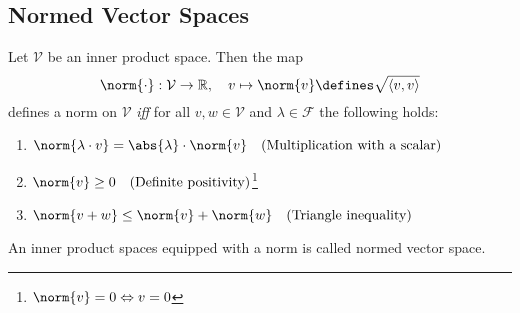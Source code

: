 \subsection{Normed Vector Spaces}\label{subsec-normed-vector-spaces}

\begin{definition}\label{def-norm}
	Let $\mathcal{V}$ be an inner product space. Then the map
	\begin{equation}
		\norm{\cdot}:\mathcal{V}\to\mathbb{R},
		\quad v\mapsto\norm{v}\defines\sqrt{\left<v,v\right>}
	\end{equation}
	defines a norm on $\mathcal{V}$ \textit{iff} for all $v,w\in\mathcal{V}$ and
	$\lambda\in\mathcal{F}$ the following holds:
	\begin{enumerate}
		\item $\norm{\lambda\cdot v}=\abs{\lambda}\cdot\norm{v}\quad\text{(Multiplication with a scalar)}$
		\item $\norm{v}\geq0\quad\text{(Definite positivity)}$\footnote{$\norm{v}=0 \Leftrightarrow v=0$}
		\item $\norm{v+w}\leq\norm{v}+\norm{w}\quad\text{(Triangle inequality)}$
	\end{enumerate}
	An inner product spaces equipped with a norm is called normed vector space.
\end{definition}

